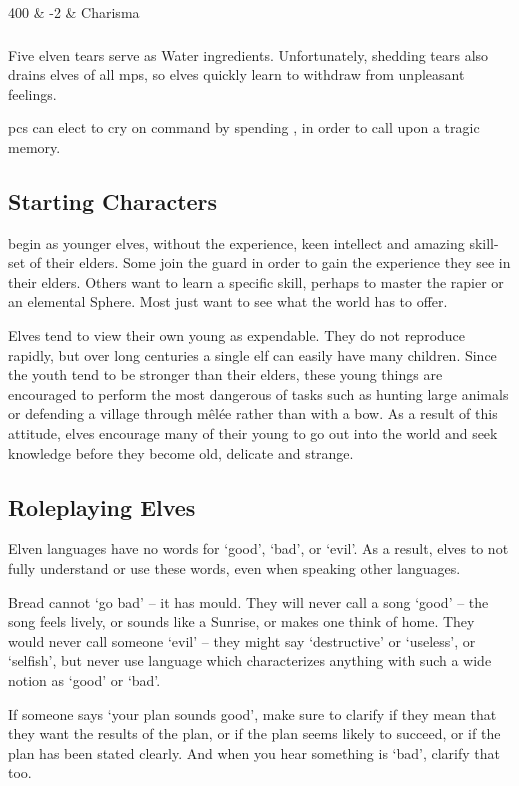 \begin{multicols}{2}
\begin{boxtable}[XcX]
    400 & -2 & Charisma \\

  \end{boxtable}

\subsubsection{}


Five elven tears serve as Water \glspl{ingredient}.
Unfortunately, shedding tears also drains elves of all \glspl{mp}, so elves quickly learn to withdraw from unpleasant feelings.

\Glspl{pc} can elect to cry on command by spending , in order to call upon a tragic memory.

\subsection{Starting Characters}

 begin as younger elves, without the experience, keen intellect and amazing skill-set of their elders.
Some join the \gls{guard} in order to gain the experience they see in their elders.
Others want to learn a specific skill, perhaps to master the rapier or an elemental Sphere.
Most just want to see what the world has to offer.

Elves tend to view their own young as expendable.
They do not reproduce rapidly, but over long centuries a single elf can easily have many children.
Since the youth tend to be stronger than their elders, these young things are encouraged to perform the most dangerous of tasks such as hunting large animals or defending a village through m\^{e}l\'{e}e rather than with a bow.
As a result of this attitude, elves encourage many of their young to go out into the world and seek knowledge before they become old, delicate and strange.

\subsection{Roleplaying Elves}

Elven languages have no words for `good', `bad', or `evil'.
As a result, elves to not fully understand or use these words, even when speaking other languages.

Bread cannot `go bad' -- it has mould.
They will never call a song `good' -- the song feels lively, or sounds like a Sunrise, or makes one think of home.
They would never call someone `evil' -- they might say `destructive' or `useless', or `selfish', but never use language which characterizes anything with such a wide notion as `good' or `bad'.

If someone says `your plan sounds good', make sure to clarify if they mean that they want the results of the plan, or if the plan seems likely to succeed, or if the plan has been stated clearly.
And when you hear something is `bad', clarify that too.

\end{multicols}

